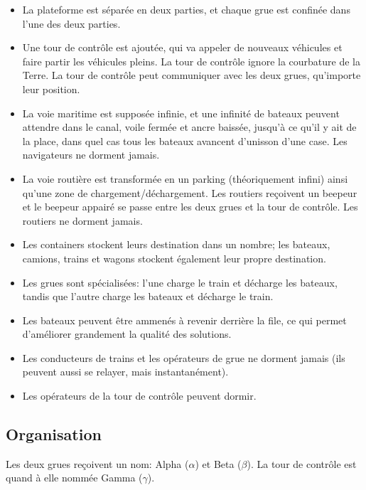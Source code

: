 \documentclass[12pt]{article}
\begin{document}
\begin{itemize}
    \item La plateforme est séparée en deux parties, et chaque grue est confinée dans l'une des deux parties.
    \item Une tour de contrôle est ajoutée, qui va appeler de nouveaux véhicules et faire partir les véhicules pleins. La tour de contrôle ignore la courbature de la Terre. La tour de contrôle peut communiquer avec les deux grues, qu'importe leur position.
    \item La voie maritime est supposée infinie, et une infinité de bateaux peuvent attendre dans le canal, voile fermée et ancre baissée, jusqu'à ce qu'il y ait de la place, dans quel cas tous les bateaux avancent d'unisson d'une case. Les navigateurs ne dorment jamais.
    \item La voie routière est transformée en un parking (théoriquement infini) ainsi qu'une zone de chargement/déchargement. Les routiers reçoivent un beepeur et le beepeur appairé se passe entre les deux grues et la tour de contrôle. Les routiers ne dorment jamais.
    \item Les containers stockent leurs destination dans un nombre; les bateaux, camions, trains et wagons stockent également leur propre destination.
    \item Les grues sont spécialisées: l'une charge le train et décharge les bateaux, tandis que l'autre charge les bateaux et décharge le train.
    \item Les bateaux peuvent être ammenés à revenir derrière la file, ce qui permet d'améliorer grandement la qualité des solutions.
    \item Les conducteurs de trains et les opérateurs de grue ne dorment jamais (ils peuvent aussi se relayer, mais instantanément).
    \item Les opérateurs de la tour de contrôle peuvent dormir.
\end{itemize}


\subsection{Organisation}

Les deux grues reçoivent un nom: Alpha ($\alpha$) et Beta ($\beta$).
La tour de contrôle est quand à elle nommée Gamma ($\gamma$).
\end{document}
